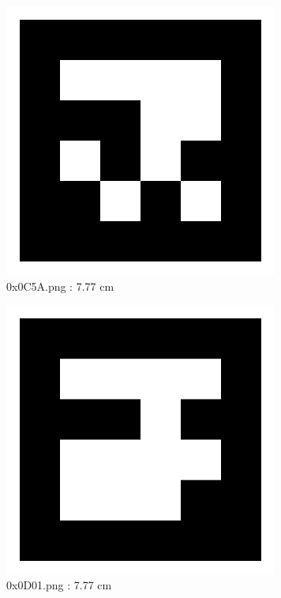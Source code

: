 \documentclass[11pt,a4,BCOR=0cm]{scrartcl}
\begin{document}
\begin{figure}
  \centering
    \includegraphics[natwidth=400,natheight=400,width=9cm]{0x0C5A.png}
    \caption{0x0C5A.png : 7.77 cm}
    \label{fig:0x0C5A.png}
  
\end{figure} 

\begin{figure}
  \centering
    \includegraphics[natwidth=400,natheight=400,width=9cm]{0x0D01.png}
    \caption{0x0D01.png : 7.77 cm}
    \label{fig:0x0D01.png}
  
\end{figure} 

\clearpage
\end{document}
